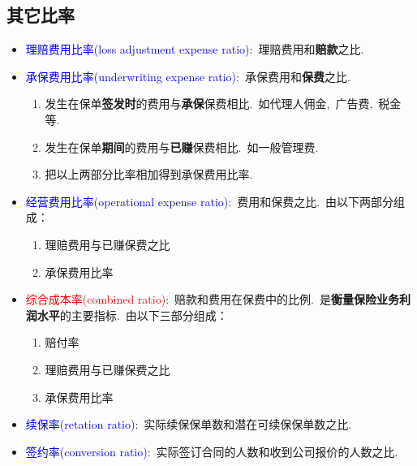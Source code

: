 \documentclass[professionalfont]{beamer}
\newcommand{\red}[1]{\textcolor{red}{#1}}
\newcommand{\green}[1]{\textbf{#1}}
\newcommand{\blue}[1]{\textcolor{blue}{#1}}
\begin{document}
\subsection{其它比率}
\begin{frame}
	\begin{itemize}
		\item \blue{理赔费用比率(loss adjustment expense ratio)}:~理赔费用和\green{赔款}之比.
		\item \blue{承保费用比率(underwriting expense ratio)}:~承保费用和\green{保费}之比.
		\begin{enumerate}
			\item 发生在保单\green{签发时}的费用与\green{承保}保费相比.~如代理人佣金,~广告费,~税金等.
			\item 发生在保单\green{期间}的费用与\green{已赚}保费相比.~如一般管理费.
			\item 把以上两部分比率相加得到承保费用比率.
		\end{enumerate}
		\end{itemize}
\end{frame}
\begin{frame}
	\begin{itemize}
		\item \blue{经营费用比率(operational expense ratio)}:~费用和保费之比.~由以下两部分组成：
		\begin{enumerate}
			\item 理赔费用与已赚保费之比
			\item 承保费用比率
		\end{enumerate}
		\item \red{综合成本率(combined ratio)}:~赔款和费用在保费中的比例.~是\green{衡量保险业务利润水平}的主要指标.~由以下三部分组成：
		\begin{enumerate}
			\item 赔付率
			\item 理赔费用与已赚保费之比
			\item 承保费用比率
		\end{enumerate}
	\end{itemize}
\end{frame}
\begin{frame}
	\begin{itemize}
		\item \blue{续保率(retation ratio)}:~实际续保保单数和潜在可续保保单数之比.
		\item \blue{签约率(conversion ratio)}:~实际签订合同的人数和收到公司报价的人数之比.
	\end{itemize}
\end{frame}
\end{document}
